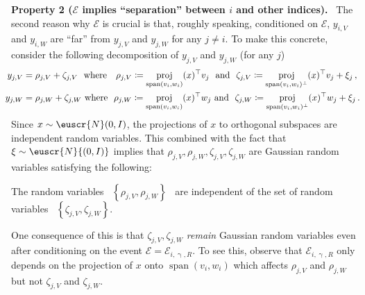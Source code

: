 \documentclass[11pt,letterpaper]{article}
\DeclareMathOperator{\Span}{span}
\DeclareMathOperator{\proj}{proj}
\theoremstyle{plain}
\theoremstyle{definition}
\theoremstyle{remark}
\newcommand{\inbrace}[1]{\ensuremath{\left\{#1\right\}}}
\newcommand{\inparen}[1]{\ensuremath{\left(#1\right)}}
\newcommand{\evE}{\ensuremath{\mathscr{E}}}
\newcommand{\customcal}[1]{\euscr{#1}}
\newcommand{\cN}{\customcal{N}}
\renewcommand{\paragraph}[1]{\medskip \noindent\textbf{#1}~}
\renewcommand{\gamma}{\upgamma}
\newcommand{\normal}[2]{\cN{\inparen{#1,#2}}}
\begin{document}
{{    \paragraph{Property 2 ($\evE$ implies ``separation'' between $i$ and other indices).}
            The second reason why $\evE$ is crucial is that, roughly speaking, conditioned on $\evE$, $y_{i,V}$ and $y_{i,W}$ are ``far'' from $y_{j,V}$ and $y_{j,W}$ for any $j\neq i$.
            To make this concrete, consider the following decomposition of $y_{j, V}$ and $y_{j, W}$ (for any $j$)
            \begin{equation}
                \begin{split}
                  \hspace{-2.5mm}y_{j, V} 
                    &= \rho_{j,V} + \zeta_{j,V}
                ~~\text{where}~~
                    ~\rho_{j,V}\coloneqq \proj_{{\rm span}(v_i,w_i)}(x)^\top v_j 
                    ~~\text{and}~~ 
                    \zeta_{j,V}\coloneqq {
                        \proj_{{\rm span}(v_i,w_i)^\bot}(x)^\top v_j
                        + \xi_j
                    }\,,\\
                \hspace{-2.5mm}y_{j, W} 
                    &= \rho_{j,W} + \zeta_{j,W}
                ~\text{where}~~
                    \rho_{j,W}\coloneqq \proj_{{\rm span}(v_i,w_i)}(x)^\top w_j 
                    ~\text{and}~~ 
                    \zeta_{j,W}\coloneqq {
                        \proj_{{\rm span}(v_i,w_i)^\bot}(x)^\top w_j
                        + \xi_{j}
                    }\,.
                \end{split}
                \label{eq:SS:decompositionOfY}
            \end{equation} 
            Since $x\sim \cN(0, I)$, the projections of $x$ to orthogonal subspaces are independent random variables.
            This combined with the fact that $\xi\sim \normal{0}{I}$ implies that $\rho_{j,V},\rho_{j,W},\zeta_{j,V},\zeta_{j,W}$ are Gaussian random variables satisfying the following:
            \begin{center}
                The random variables ~$\inbrace{\rho_{j,V},\rho_{j,W}}$~ are independent of the set of random variables ~$\inbrace{\zeta_{j,V},\zeta_{j,W}}$.
            \end{center}
            One consequence of this is that $\zeta_{j,V},\zeta_{j,W}$ \textit{remain} Gaussian random variables even after conditioning on the event $\evE=\evE_{i,\gamma,R}$.
            To see this, observe that $\evE_{i,\gamma,R}$ only depends on the projection of $x$ onto $\Span(v_i,w_i)$ which affects $\rho_{j,V}$ and $\rho_{j,W}$ but not $\zeta_{j,V}$ and $\zeta_{j,W}$.
}}
\end{document}
